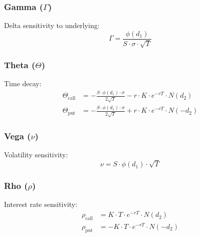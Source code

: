 \subsubsection{Gamma ($\Gamma$)}
Delta sensitivity to underlying:
\begin{equation}
\Gamma = \frac{\phi(d_1)}{S \cdot \sigma \cdot \sqrt{T}}
\end{equation}

\subsubsection{Theta ($\Theta$)}
Time decay:
\begin{align}
\Theta_{\text{call}} &= -\frac{S \cdot \phi(d_1) \cdot \sigma}{2\sqrt{T}} - r \cdot K \cdot e^{-rT} \cdot N(d_2) \\
\Theta_{\text{put}} &= -\frac{S \cdot \phi(d_1) \cdot \sigma}{2\sqrt{T}} + r \cdot K \cdot e^{-rT} \cdot N(-d_2)
\end{align}

\subsubsection{Vega ($\nu$)}
Volatility sensitivity:
\begin{equation}
\nu = S \cdot \phi(d_1) \cdot \sqrt{T}
\end{equation}

\subsubsection{Rho ($\rho$)}
Interest rate sensitivity:
\begin{align}
\rho_{\text{call}} &= K \cdot T \cdot e^{-rT} \cdot N(d_2) \\
\rho_{\text{put}} &= -K \cdot T \cdot e^{-rT} \cdot N(-d_2)
\end{align}

